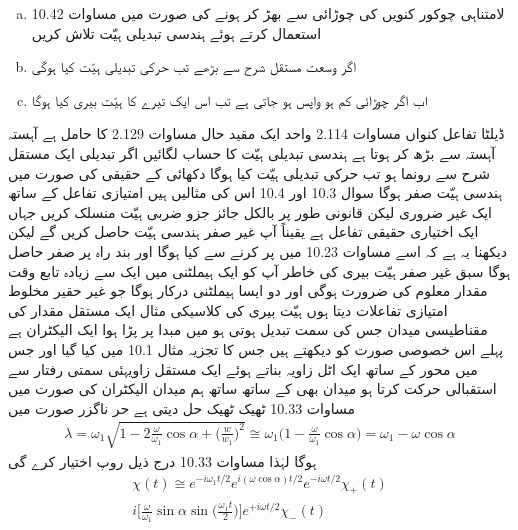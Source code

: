 \begin{enumerate}[a.]
\item
لامتناہی چوکور کنویں کی چوڑائی   سے بھڑ کر  ہونے کی صورت میں مساوات 10.42 استعمال کرتے ہوئے ہندسی تبدیلی ہیّت تلاش کریں 
\item
اگر وسعت مستقل شرح  سے بڑھے تب حرکی تبدیلی ہیّت کیا ہوگی 
\item
اب اگر چوڑائی کم ہو واپس  ہو جاتی ہے تب اس ایک تیرے کا ہیّت بیری کیا ہوگا 
\end{enumerate}
ڈیلٹا تفاعل کنواں مساوات 2.114 واحد ایک مقید حال مساوات 2.129 کا حامل ہے  آہستہ آہستہ  سے بڑھ کر  ہوتا ہے ہندسی تبدیلی ہیّت کا حساب لگائیں اگر تبدیلی ایک مستقل شرح  سے رونما ہو تب حرکی تبدیلی ہیّت کیا ہوگا 
دکھائی کے حقیقی  کی صورت میں ہندسی ہیّت صفر ہوگا سوال 10.3 اور 10.4 اس کی مثالیں ہیں امتیازی تفاعل کے ساتھ ایک غیر ضروری لیکن قانونی  طور پر بالکل جائز جزو ضربی ہیّت منسلک کریں  جہاں  ایک اختیاری حقیقی تفاعل ہے یقیناً آپ غیر صفر ہندسی ہیّت حاصل کریں گے لیکن دیکھنا یہ ہے کہ اسے مساوات 10.23 میں پر کرنے سے کیا ہوگا اور بند راہ پر صفر حاصل ہوگا سبق غیر صفر ہیّت بیری کی خاطر آپ کو ایک ہیملٹنی میں ایک سے زیادہ تابع وقت مقدار معلوم کی ضرورت ہوگی اور دو  ایسا ہیملٹنی درکار ہوگا جو غیر حقیر  مخلوط امتیازی تفاعلات دیتا ہوں 
ہیّت بیری کی کلاسیکی مثال ایک مستقل مقدار کی مقناطیسی میدان جس کی سمت تبدیل ہوتی ہو میں مبدا پر پڑا ہوا ایک الیکٹران ہے پہلے اس خصوصی صورت کو دیکھتے ہیں جس کا تجزیہ مثال 10.1 میں کیا گیا اور جس میں محور  کے ساتھ ایک اٹل زاویہ  بناتے ہوئے  ایک مستقل زاویہئی سمتی رفتار  سے استقبالی حرکت کرتا ہو میدان بھی کے ساتھ ساتھ ہم میدان الیکٹران کی صورت میں مساوات 10.33 ٹھیک ٹھیک حل دیتی ہے حر ناگزر صورت  میں 
\begin{align}
\lambda = \omega_1 \sqrt{1 - 2 \frac{\omega}{\omega_1} \cos \alpha + \big ( \frac{w}{w_1} \big )^2 } \cong \omega_1 \big ( 1 - \frac{\omega}{\omega_1} \cos \alpha \big ) = \omega_1 - \omega \cos \alpha
\end{align}
ہوگا لہٰذا مساوات 10.33 درج ذیل روپ اختیار کرے گی 
\begin{multline}
\chi (t) \cong e^{- i \omega_1 t/2} e^{i (\omega \cos \alpha) t/2} e^{- i \omega t/2} \chi_+(t) \\
i \big [ \frac{\omega}{\omega_1} \sin \alpha \sin \big ( \frac{\omega_1 t}{2} \big ) \big ]e^{+ i \omega t/2} \chi_{-} (t)
\end{multline}
